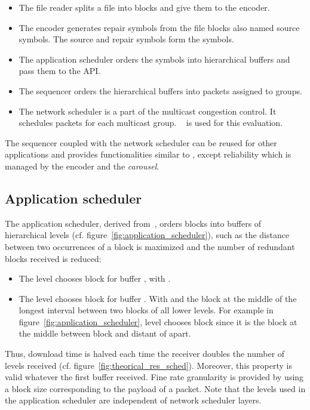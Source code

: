 \documentclass[a4paper]{article}
\begin{document}
    \begin{itemize}
        \item{
            The file reader splits a file into blocks and give them to the 
                encoder.
        }
        \item{
            The  encoder generates repair symbols from the file blocks also
                named source symbols. The source and repair symbols form
                the  symbols.
        }
        \item{
            The application scheduler orders the  symbols into hierarchical
                buffers and pass them to the API.
        }
        \item{
            The sequencer orders the hierarchical buffers into packets assigned
                to groups.
        }
        \item{
            The network scheduler is a part of the multicast congestion control.
                It schedules packets for each multicast group.
                ~\cite{lucas_fair_2009} is used for this evaluation.
        }
    \end{itemize}
    The sequencer coupled with the network scheduler can be reused for other
    applications and provides functionalities similar to , except
    reliability which is managed by the  encoder and the \textit{carousel}.

    \subsection{Application scheduler}
        The application scheduler, derived from~\cite{birk_multicast_2003},
        orders  blocks into buffers of  hierarchical levels (cf.
                figure~\ref{fig:application_scheduler}), such as the distance
        between two occurrences of a block is maximized and the number of
        redundant blocks received is reduced:
\begin{itemize}
           \item{
               The level  chooses block  for buffer , with .
           } 
           \item{
               The level  chooses block  for buffer . With  and  the block at the middle of the longest
                   interval between two blocks of all lower levels.  For example
                   in figure~\ref{fig:application_scheduler}, level  chooses
                   block  since it is the block at the middle between block
                    and  distant of  apart.
} 
        \end{itemize}
        Thus, download time is halved each time the receiver doubles the
        number of levels received (cf.  figure~\ref{fig:theorical_res_sched}).
        Moreover, this property is valid whatever the first buffer  received.
Fine rate granularity is provided by using a block size corresponding to
        the payload of a packet.
Note that the levels used in the application scheduler are independent
        of network scheduler layers.
\end{document}
